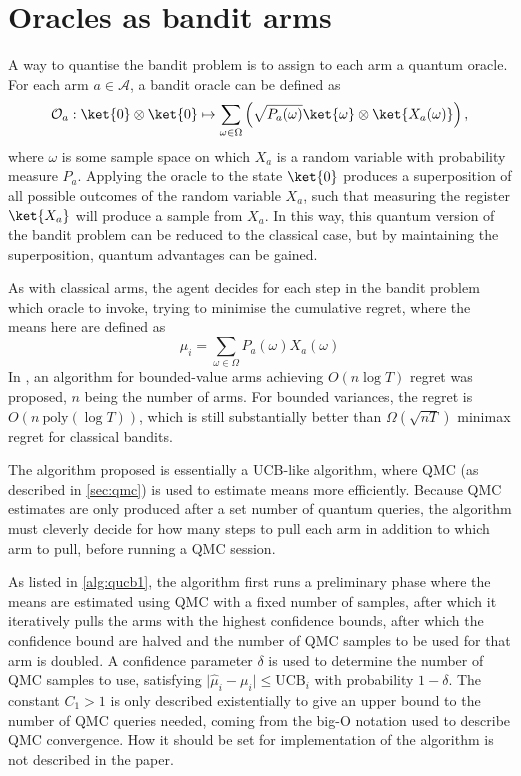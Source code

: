 \section{Oracles as bandit arms}
A way to quantise the bandit problem is to assign to each arm a quantum oracle.
For each arm $a \in \mathcal{A}$, a bandit oracle can be defined as
\begin{equation}
    \mathcal{O}_a: \ket{0}\otimes\ket{0} \mapsto \sum_{\omega \in \Omega} \left(\sqrt{P_a(\omega)} \ket{\omega} \otimes \ket{X_a(\omega)} \right),
    \label{eq:wan_oracle}
\end{equation}
where $\omega$ is some sample space on which $X_a$ is a random variable with probability measure $P_a$.
Applying the oracle to the state $\ket{0}$ produces a superposition of all possible outcomes of the random variable $X_a$, such that measuring the register $\ket{X_a}$ will produce a sample from $X_a$.
In this way, this quantum version of the bandit problem can be reduced to the classical case, but by maintaining the superposition, quantum advantages can be gained.

As with classical arms, the agent decides for each step in the bandit problem which oracle to invoke, trying to minimise the cumulative regret, where the means here are defined as
\begin{equation}
    \mu_i = \sum_{\omega \in \Omega} P_a(\omega) X_a(\omega)
\end{equation}
In \autocite{wan2022}, an algorithm for bounded-value arms achieving $O(n \log T)$ regret was proposed, $n$ being the number of arms.
For bounded variances, the regret is $O(n \ \text{poly}(\log T))$, which is still substantially better than $\Omega(\sqrt{nT})$ minimax regret for classical bandits.

The algorithm proposed is essentially a UCB-like algorithm, where QMC (as described in \cref{sec:qmc}) is used to estimate means more efficiently.
Because QMC estimates are only produced after a set number of quantum queries, the algorithm must cleverly decide for how many steps to pull each arm in addition to which arm to pull, before running a QMC session.

As listed in \cref{alg:qucb1}, the algorithm first runs a preliminary phase where the means are estimated using QMC with a fixed number of samples, after which it iteratively pulls the arms with the highest confidence bounds, after which the confidence bound are halved and the number of QMC samples to be used for that arm is doubled.
A confidence parameter $\delta$ is used to determine the number of QMC samples to use, satisfying $\lvert\hat{\mu}_i - \mu_i\rvert \leq \text{UCB}_i$ with probability $1-\delta$.
The constant $C_1>1$ is only described existentially to give an upper bound to the number of QMC queries needed, coming from the big-O notation used to describe QMC convergence.
How it should be set for implementation of the algorithm is not described in the paper.


